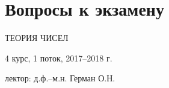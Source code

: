 
\clearpage
{}

\fancyhfoffset[O]{0pt}
\pagestyle{questions}


\section*{Вопросы к экзамену}
\label{sec:exam-questions}

{\centering\scshape
    \huge
    ТЕОРИЯ ЧИСЕЛ

    \vspace{0.5cm}

    \large
    4 курс, 1 поток, 2017--2018 г.

    \vspace{0.15cm}

    \normalsize
    лектор: д.ф.--м.н. Герман О.Н.

    \vspace{1cm}
\par}

